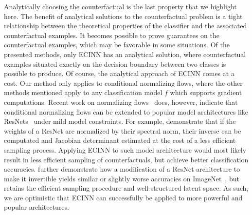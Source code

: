 \documentclass[11pt,a4paper,twoside,openright,final]{memoir}
\makeatletter
\def\ifdraft{\ifdim\overfullrule>\z@
  \expandafter\@firstoftwo\else\expandafter\@secondoftwo\fi}
\newcommand{\todo}[1]{{
    \ifdraft{
        \color[rgb]{.5,0,0}\textbf{
            $\blacktriangleright$#1$\blacktriangleleft$
         }
    }{}}}
\makeatother
\begin{document}
Analytically choosing the counterfactual is the last property that we highlight here.
The benefit of analytical solutions to the counterfactual problem is a tight relationship between the theoretical properties of the classifier and the associated counterfactual examples.
It becomes possible to prove guarantees on the counterfactual examples, which may be favorable in some situations. 
Of the presented methods, only ECINN has an analytical solution, where counterfactual examples situated exactly on the decision boundary between two classes is possible to produce.
Of course, the analytical approach of ECINN comes at a cost.
% 
Our method only applies to conditional normalizing flows, where the other methods mentioned apply to any classification model $f$ which supports gradient computations.
Recent work on normalizing flows~\cite{iresnet, ffjord, expl-inn} does, however, indicate that conditional normalizing flows can be extended to popular model architectures like ResNets~\cite{resnet} under mild model constraints. 
For example, \cite{iresnet} demonstrate that if the weights of a ResNet are normalized by their spectral norm, their inverse can be computated and Jacobian determinant estimated at the cost of a less efficient sampling process.
Applying ECINN to such model architecture would most likely result in less efficient sampling of counterfactuals, but achieve better classification accuracies.
\citet{expl-inn} further demonstrate how a modification of a ResNet architecture to make it invertible yields similar or slightly worse accuracies on ImageNet~\cite{imagenet}, but retains the efficient sampling procedure and well-structured latent space.
As such, we are optimistic that ECINN can successfully be applied to more powerful and popular architectures.
    
\end{document}
